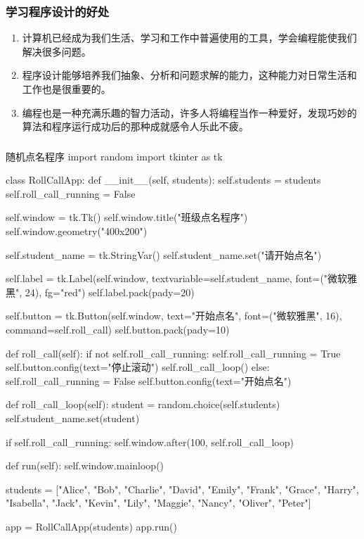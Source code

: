 \begin{frame}
    \frametitle{学习程序设计的好处}
    \begin{enumerate}
      \item 计算机已经成为我们生活、学习和工作中普遍使用的工具，学会编程能使我们解决很多问题。
      \item 程序设计能够培养我们抽象、分析和问题求解的能力，这种能力对日常生活和工作也是很重要的。
      \item 编程也是一种充满乐趣的智力活动，许多人将编程当作一种爱好，发现巧妙的算法和程序运行成功后的那种成就感令人乐此不疲。
    \end{enumerate}
\end{frame}


\begin{frame}[fragile]
    \frametitle{}
\begin{codeblock}[firstline=1, lastline =15]{随机点名程序}
  import random
  import tkinter as tk
  
  
  class RollCallApp:
      def __init__(self, students):
          self.students = students
          self.roll_call_running = False
  
          self.window = tk.Tk()
          self.window.title("班级点名程序")
          self.window.geometry("400x200")
  
          self.student_name = tk.StringVar()
          self.student_name.set("请开始点名")
  
          self.label = tk.Label(self.window, textvariable=self.student_name, font=("微软雅黑", 24), fg="red")
          self.label.pack(pady=20)
  
          self.button = tk.Button(self.window, text="开始点名", font=("微软雅黑", 16),  command=self.roll_call)
          self.button.pack(pady=10)
  
      def roll_call(self):
          if not self.roll_call_running:
              self.roll_call_running = True
              self.button.config(text="停止滚动")
              self.roll_call_loop()
          else:
              self.roll_call_running = False
              self.button.config(text="开始点名")
  
      def roll_call_loop(self):
          student = random.choice(self.students)
          self.student_name.set(student)
  
          if self.roll_call_running:
              self.window.after(100, self.roll_call_loop)
  
      def run(self):
          self.window.mainloop()
  
  
  students = ["Alice", "Bob", "Charlie", "David", "Emily", "Frank", "Grace", "Harry", "Isabella", "Jack", "Kevin", "Lily", "Maggie", "Nancy", "Oliver", "Peter"]
  
  app = RollCallApp(students)
  app.run()
\end{codeblock}
\end{frame}


